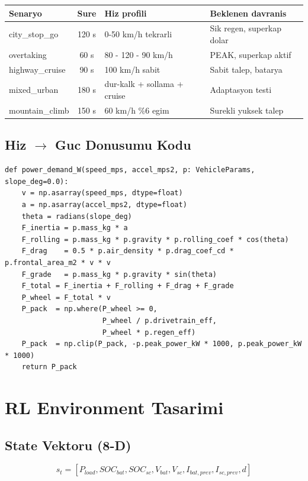 \documentclass[11pt,a4paper]{article}
\begin{document}
\begin{center}
\begin{tabular}{lcp{4.5cm}p{4.0cm}}
\toprule
Senaryo & Sure & Hiz profili & Beklenen davranis \\
\midrule
city\_stop\_go & 120 s & 0-50 km/h tekrarli & Sik regen, superkap dolar \\
overtaking & 60 s & 80 - 120 - 90 km/h & PEAK, superkap aktif \\
highway\_cruise & 90 s & 100 km/h sabit & Sabit talep, batarya \\
mixed\_urban & 180 s & dur-kalk + sollama + cruise & Adaptasyon testi \\
mountain\_climb & 150 s & 60 km/h \%6 egim & Surekli yuksek talep \\
\bottomrule
\end{tabular}
\end{center}

\subsection{Hiz $\to$ Guc Donusumu Kodu}

\begin{lstlisting}[style=py,caption={src/vehicle.py}]
def power_demand_W(speed_mps, accel_mps2, p: VehicleParams, slope_deg=0.0):
    v = np.asarray(speed_mps, dtype=float)
    a = np.asarray(accel_mps2, dtype=float)
    theta = radians(slope_deg)
    F_inertia = p.mass_kg * a
    F_rolling = p.mass_kg * p.gravity * p.rolling_coef * cos(theta)
    F_drag    = 0.5 * p.air_density * p.drag_coef_cd * p.frontal_area_m2 * v * v
    F_grade   = p.mass_kg * p.gravity * sin(theta)
    F_total = F_inertia + F_rolling + F_drag + F_grade
    P_wheel = F_total * v
    P_pack  = np.where(P_wheel >= 0,
                       P_wheel / p.drivetrain_eff,
                       P_wheel * p.regen_eff)
    P_pack  = np.clip(P_pack, -p.peak_power_kW * 1000, p.peak_power_kW * 1000)
    return P_pack
\end{lstlisting}

\section{RL Environment Tasarimi}

\subsection{State Vektoru (8-D)}

\[
s_t = [P_{load}, SOC_{bat}, SOC_{sc}, V_{bat}, V_{sc}, I_{bat,prev}, I_{sc,prev}, d]
\]
\end{document}
